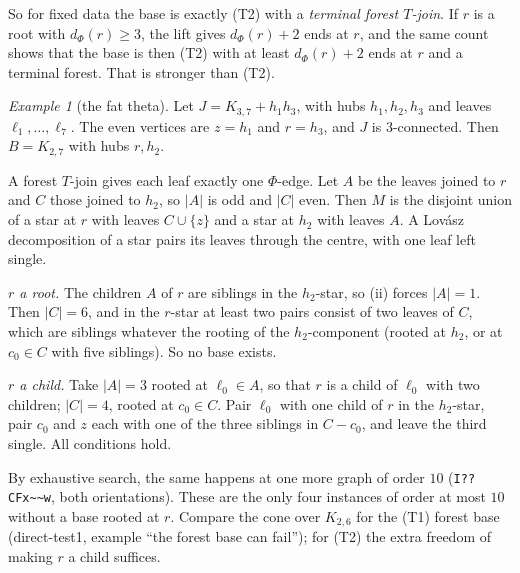 \documentclass[11pt]{amsart}
\theoremstyle{definition}
\theoremstyle{remark}
\newtheorem{example}[theorem]{Example}
\renewcommand{\_}{\oldunderscore\allowbreak}
\begin{document}
So for fixed data the base is exactly (T2) with a \emph{terminal forest $T$-join}. If $r$ is a root
with $d_\Phi(r)\ge3$, the lift gives $d_\Phi(r)+2$ ends at $r$, and the same count shows that the base
is then (T2) with at least $d_\Phi(r)+2$ ends at $r$ and a terminal forest. That is stronger than (T2).

\begin{example}[the fat theta]\label{ex:theta}
Let $J=K_{3,7}+h_1h_3$, with hubs $h_1,h_2,h_3$ and leaves $\ell_1,\dots,\ell_7$. The even vertices
are $z=h_1$ and $r=h_3$, and $J$ is $3$-connected. Then $B=K_{2,7}$ with hubs $r,h_2$.

A forest $T$-join gives each leaf exactly one $\Phi$-edge. Let $A$ be the leaves joined to $r$ and $C$
those joined to $h_2$, so $|A|$ is odd and $|C|$ even. Then $M$ is the disjoint union of a star at $r$
with leaves $C\cup\{z\}$ and a star at $h_2$ with leaves $A$. A Lov\'asz decomposition of a star pairs
its leaves through the centre, with one leaf left single.

\emph{$r$ a root.} The children $A$ of $r$ are siblings in the $h_2$-star, so (ii) forces $|A|=1$. Then
$|C|=6$, and in the $r$-star at least two pairs consist of two leaves of $C$, which are siblings
whatever the rooting of the $h_2$-component (rooted at $h_2$, or at $c_0\in C$ with five siblings).
So no base exists.

\emph{$r$ a child.} Take $|A|=3$ rooted at $\ell_0\in A$, so that $r$ is a child of $\ell_0$ with two
children; $|C|=4$, rooted at $c_0\in C$. Pair $\ell_0$ with one child of $r$ in the $h_2$-star, pair
$c_0$ and $z$ each with one of the three siblings in $C-c_0$, and leave the third single. All
conditions hold.

By exhaustive search, the same happens at one more graph of order $10$
(\texttt{I??CFx\textasciitilde\textasciitilde w}, both orientations). These are the only four instances of order
at most $10$ without a base rooted at $r$. Compare the cone over $K_{2,6}$ for the (T1) forest base
(direct-test1, example ``the forest base can fail''); for (T2) the extra freedom of making $r$ a child suffices.
\end{example}
\end{document}
